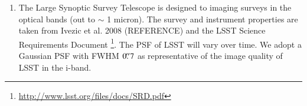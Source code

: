 \documentclass[a4paper,11pt]{article}
\begin{document}
\begin{enumerate}
\item The Large Synoptic Survey Telescope is designed to imaging surveys in the optical bands (out to $\sim$ 1 micron). %
The survey and instrument properties are taken from Ivezic et al. 2008 (REFERENCE) and the LSST Science Requirements Document \footnote{\url{http://www.lsst.org/files/docs/SRD.pdf}}. The PSF of LSST will vary over time. We adopt a Gaussian PSF with FWHM $0\hbox{$.\!\!^{\prime\prime}$}7$ as representative of the image quality of LSST in the i-band.

\end{enumerate}

\end{document}
